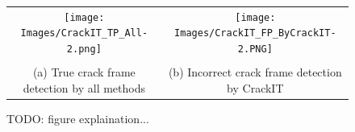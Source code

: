         
        \begin{figure}
        
            \begin{centering}
                \begin{tabular}{c|c}
                    \texttt{[image: Images/CrackIT\_TP\_All-2.png]} & \texttt{[image: Images/CrackIT\_FP\_ByCrackIT-2.PNG]} \\
                     \\
                    (a) True crack frame detection by all methods & (b) Incorrect crack frame detection by CrackIT
                \end{tabular}
                
                \caption{TODO: figure explaination...}
                \label{crackitExamples}
                 
            \end{centering}
            
        \end{figure}
        
